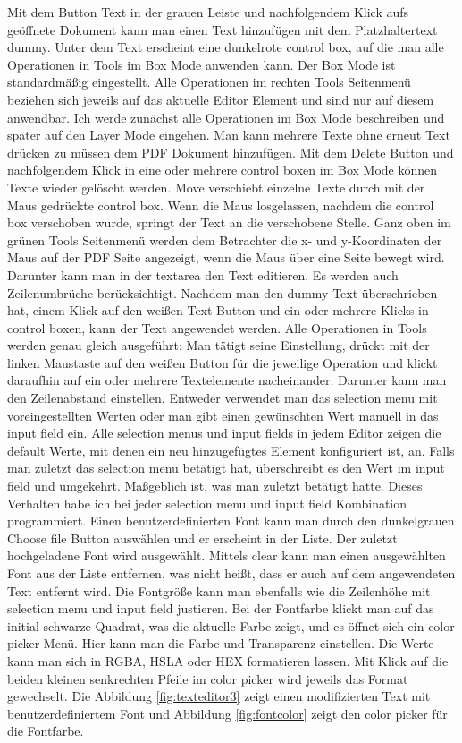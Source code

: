 Mit dem Button Text in der grauen Leiste und nachfolgendem Klick aufs geöffnete Dokument kann man einen Text hinzufügen mit dem Platzhaltertext dummy. Unter dem Text erscheint eine dunkelrote control box, auf die man alle Operationen in Tools im Box Mode anwenden kann. Der Box Mode ist standardmäßig eingestellt. Alle Operationen im rechten Tools Seitenmenü beziehen sich jeweils auf das aktuelle Editor Element und sind nur auf diesem anwendbar. Ich werde zunächst alle Operationen im Box Mode beschreiben und später auf den Layer Mode eingehen. Man kann mehrere Texte ohne erneut Text drücken zu müssen dem PDF Dokument hinzufügen. Mit dem Delete Button und nachfolgendem Klick in eine oder mehrere control boxen im Box Mode können Texte wieder gelöscht werden. Move verschiebt einzelne Texte durch mit der Maus gedrückte control box. Wenn die Maus losgelassen, nachdem die control box verschoben wurde, springt der Text an die verschobene Stelle. Ganz oben im grünen Tools Seitenmenü werden dem Betrachter die x- und y-Koordinaten der Maus auf der PDF Seite angezeigt, wenn die Maus über eine Seite bewegt wird. Darunter kann man in der textarea den Text editieren. Es werden auch Zeilenumbrüche berücksichtigt. Nachdem man den dummy Text überschrieben hat, einem Klick auf den weißen Text Button und ein oder mehrere Klicks in control boxen, kann der Text angewendet werden. Alle Operationen in Tools werden genau gleich ausgeführt: Man tätigt seine Einstellung, drückt mit der linken Maustaste auf den weißen Button für die jeweilige Operation und klickt daraufhin auf ein oder mehrere Textelemente nacheinander. Darunter kann man den Zeilenabstand einstellen. Entweder verwendet man das selection menu mit voreingestellten Werten oder man gibt einen gewünschten Wert manuell in das input field ein. Alle selection menus und input fields in jedem Editor zeigen die default Werte, mit denen ein neu hinzugefügtes Element konfiguriert ist, an. Falls man zuletzt das selection menu betätigt hat, überschreibt es den Wert im input field und umgekehrt. Maßgeblich ist, was man zuletzt betätigt hatte. Dieses Verhalten habe ich bei jeder selection menu und input field Kombination programmiert. Einen benutzerdefinierten Font kann man durch den dunkelgrauen Choose file Button auswählen und er erscheint in der Liste. Der zuletzt hochgeladene Font wird ausgewählt. Mittels clear kann man einen ausgewählten Font aus der Liste entfernen, was nicht heißt, dass er auch auf dem angewendeten Text entfernt wird. Die Fontgröße kann man ebenfalls wie die Zeilenhöhe mit selection menu und input field justieren. Bei der Fontfarbe klickt man auf das initial schwarze Quadrat, was die aktuelle Farbe zeigt, und es öffnet sich ein color picker Menü. Hier kann man die Farbe und Transparenz einstellen. Die Werte kann man sich in RGBA, HSLA oder HEX formatieren lassen. Mit Klick auf die beiden kleinen senkrechten Pfeile im color picker wird jeweils das Format gewechselt. Die Abbildung \ref{fig:texteditor3} zeigt einen modifizierten Text mit benutzerdefiniertem Font und Abbildung \ref{fig:fontcolor} zeigt den color picker für die Fontfarbe. 

